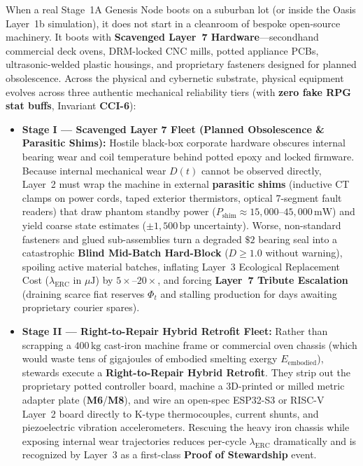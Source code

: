 When a real Stage~1A Genesis Node boots on a suburban lot (or inside the Oasis Layer~1b simulation), it does not start in a cleanroom of bespoke open-source machinery. It boots with \textbf{Scavenged Layer~7 Hardware}---secondhand commercial deck ovens, DRM-locked CNC mills, potted appliance PCBs, ultrasonic-welded plastic housings, and proprietary fasteners designed for planned obsolescence. Across the physical and cybernetic substrate, physical equipment evolves across three authentic mechanical reliability tiers (with \textbf{zero fake RPG stat buffs}, Invariant \textbf{CCI-6}):
\begin{itemize}
    \item \textbf{Stage I --- Scavenged Layer 7 Fleet (Planned Obsolescence \& Parasitic Shims):} Hostile black-box corporate hardware obscures internal bearing wear and coil temperature behind potted epoxy and locked firmware. Because internal mechanical wear $D(t)$ cannot be observed directly, Layer~2 must wrap the machine in external \textbf{parasitic shims} (inductive CT clamps on power cords, taped exterior thermistors, optical 7-segment fault readers) that draw phantom standby power ($P_{\mathrm{shim}} \approx 15{,}000\text{--}45{,}000\,\mathrm{mW}$) and yield coarse state estimates ($\pm 1{,}500\,\mathrm{bp}$ uncertainty). Worse, non-standard fasteners and glued sub-assemblies turn a degraded $\$2$ bearing seal into a catastrophic \textbf{Blind Mid-Batch Hard-Block} ($D \ge 1.0$ without warning), spoiling active material batches, inflating Layer~3 Ecological Replacement Cost ($\lambda_{\mathrm{ERC}}$ in $\mu\mathrm{J}$) by $5\times\text{--}20\times$, and forcing \textbf{Layer~7 Tribute Escalation} (draining scarce fiat reserves $\Phi_t$ and stalling production for days awaiting proprietary courier spares).
    \item \textbf{Stage II --- Right-to-Repair Hybrid Retrofit Fleet:} Rather than scrapping a $400\,\mathrm{kg}$ cast-iron machine frame or commercial oven chassis (which would waste tens of gigajoules of embodied smelting exergy $E_{\mathrm{embodied}}$), stewards execute a \textbf{Right-to-Repair Hybrid Retrofit}. They strip out the proprietary potted controller board, machine a 3D-printed or milled metric adapter plate (\textbf{M6}/\textbf{M8}), and wire an open-spec ESP32-S3 or RISC-V Layer~2 board directly to K-type thermocouples, current shunts, and piezoelectric vibration accelerometers. Rescuing the heavy iron chassis while exposing internal wear trajectories reduces per-cycle $\lambda_{\mathrm{ERC}}$ dramatically and is recognized by Layer~3 as a first-class \textbf{Proof of Stewardship} event.

\end{itemize}
